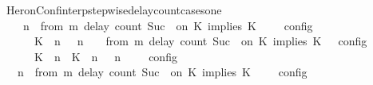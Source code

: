 \begin{isabellebody}
\isanewline
\isanewline
%
%
\endisatagproof
{\isafoldproof}%
%
\isadelimproof
\isanewline
%
\endisadelimproof
{}\isamarkupfalse%
\ HeronConf{\isacharunderscore}interp{\isacharunderscore}stepwise{\isacharunderscore}delay{\isacharunderscore}count{\isacharunderscore}cases{\isacharunderscore}one{\isacharcolon}\isanewline
\ \ {\isacartoucheopen}{\isasymlbrakk}\ {\isasymGamma}{\isacharcomma}\ n\ {\isasymturnstile}\ {\isacharparenleft}{\isacharparenleft}from\ m\ delay\ count\ {\isacharparenleft}Suc\ {}{\isacharparenright}\ on\ K\ implies\ K\ {\isacharhash}\ {\isasymPsi}{\isacharparenright}\ {\isasymtriangleright}\ {\isasymPhi}\ {\isasymrbrakk}\isactrlsub c\isactrlsub o\isactrlsub n\isactrlsub f\isactrlsub i\isactrlsub g\isanewline
\ \ \ \ {\isacharequal}\ {\isasymlbrakk}\ {\isacharparenleft}{\isacharparenleft}K\ {\isasymnot}{\isasymUp}\ n{\isacharparenright}\ {\isacharhash}\ {\isasymGamma}{\isacharparenright}{\isacharcomma}\ n\ {\isasymturnstile}\ {\isasymPsi}\ {\isasymtriangleright}\ {\isacharparenleft}{\isacharparenleft}from\ m\ delay\ count\ {\isacharparenleft}Suc\ {}{\isacharparenright}\ on\ K\ implies\ K\ {\isacharhash}\ {\isasymPhi}{\isacharparenright}\ {\isasymrbrakk}\isactrlsub c\isactrlsub o\isactrlsub n\isactrlsub f\isactrlsub i\isactrlsub g\isanewline
\ \ \ \ {\isasymunion}\ {\isasymlbrakk}\ {\isacharparenleft}{\isacharparenleft}K\ {\isasymUp}\ n{\isacharparenright}\ {\isacharhash}\ {\isacharparenleft}K\ {\isasymUp}\ n{\isacharparenright}\ {\isacharhash}\ {\isasymGamma}{\isacharparenright}{\isacharcomma}\ n\ {\isasymturnstile}\ {\isasymPsi}\ {\isasymtriangleright}\ {\isasymPhi}\ {\isasymrbrakk}\isactrlsub c\isactrlsub o\isactrlsub n\isactrlsub f\isactrlsub i\isactrlsub g\isanewline
\ \ {\isacartoucheclose}\isanewline
%
\isadelimproof
%
\endisadelimproof
%
\isatagproof
{}\isamarkupfalse%
\ {\isacharminus}\isanewline
\ \ \isamarkupfalse%
\ {\isacartoucheopen}{\isasymlbrakk}\ {\isasymGamma}{\isacharcomma}\ n\ {\isasymturnstile}\ {\isacharparenleft}{\isacharparenleft}from\ m\ delay\ count\ {\isacharparenleft}Suc\ {}{\isacharparenright}\ on\ K\ implies\ K\ {\isacharhash}\ {\isasymPsi}{\isacharparenright}\ {\isasymtriangleright}\ {\isasymPhi}\ {\isasymrbrakk}\isactrlsub c\isactrlsub o\isactrlsub n\isactrlsub f\isactrlsub i\isactrlsub g\isanewline

\end{isabellebody}

